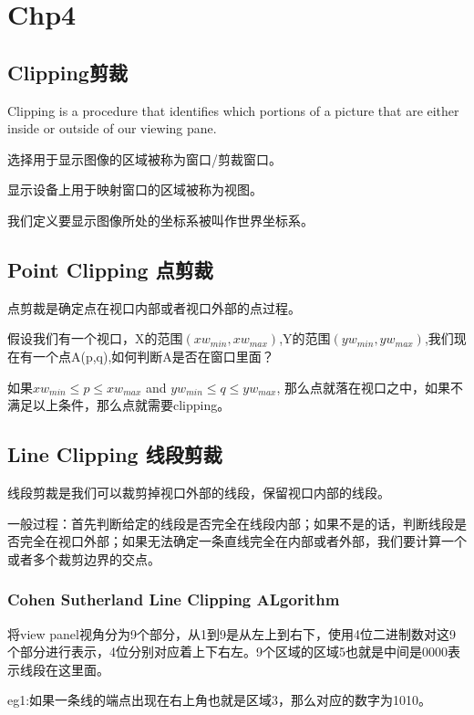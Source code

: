 \documentclass[UTF8]{ctexart}
\begin{document}
\section{Chp4}
\subsection{Clipping剪裁}
Clipping is a procedure that identifies which portions of a picture that are either inside or outside of our viewing pane.

选择用于显示图像的区域被称为窗口/剪裁窗口。

显示设备上用于映射窗口的区域被称为视图。

我们定义要显示图像所处的坐标系被叫作世界坐标系。

\subsection{Point Clipping 点剪裁}
点剪裁是确定点在视口内部或者视口外部的点过程。

假设我们有一个视口，X的范围$(xw_{min},xw_{max})$,Y的范围$(yw_{min},yw_{max})$,我们现在有一个点A(p,q),如何判断A是否在窗口里面？

如果$xw_{min}\leq p\leq xw_{max} $ and $yw_{min}\leq q\leq yw_{max} $, 那么点就落在视口之中，如果不满足以上条件，那么点就需要clipping。

\subsection{Line Clipping 线段剪裁}
线段剪裁是我们可以裁剪掉视口外部的线段，保留视口内部的线段。

一般过程：首先判断给定的线段是否完全在线段内部；如果不是的话，判断线段是否完全在视口外部；如果无法确定一条直线完全在内部或者外部，我们要计算一个或者多个裁剪边界的交点。

\subsubsection{Cohen Sutherland Line Clipping ALgorithm}
将view panel视角分为9个部分，从1到9是从左上到右下，使用4位二进制数对这9个部分进行表示，4位分别对应着上下右左。9个区域的区域5也就是中间是0000表示线段在这里面。

eg1:如果一条线的端点出现在右上角也就是区域3，那么对应的数字为1010。
\end{document}
